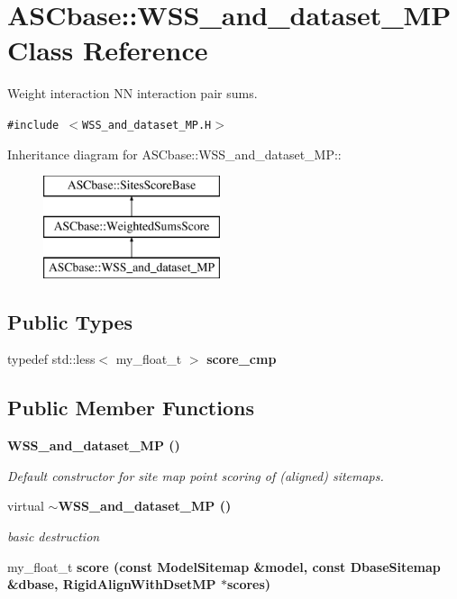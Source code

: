 \section{ASCbase::WSS\_\-and\_\-dataset\_\-MP Class Reference}
\label{classASCbase_1_1WSS__and__dataset__MP}
Weight interaction NN interaction pair sums.  


{\tt \#include $<$WSS\_\-and\_\-dataset\_\-MP.H$>$}

Inheritance diagram for ASCbase::WSS\_\-and\_\-dataset\_\-MP::\begin{figure}[H]
\begin{center}
\leavevmode
\includegraphics[height=3cm]{classASCbase_1_1WSS__and__dataset__MP}
\end{center}
\end{figure}
\subsection*{Public Types}
\begin{CompactItemize}
\item 
typedef std::less$<$ my\_\-float\_\-t $>$ \textbf{score\_\-cmp}\label{classASCbase_1_1WSS__and__dataset__MP_f17104e906fa8b27692f8956cb88c5f6}

\end{CompactItemize}
\subsection*{Public Member Functions}
\begin{CompactItemize}
\item 
\bf{WSS\_\-and\_\-dataset\_\-MP} ()\label{classASCbase_1_1WSS__and__dataset__MP_9dcca2b8b93687cd031fae82a6327ffe}

\begin{CompactList}\small\item\em Default constructor for site map point scoring of (aligned) sitemaps. \item\end{CompactList}\item 
virtual \bf{$\sim$WSS\_\-and\_\-dataset\_\-MP} ()\label{classASCbase_1_1WSS__and__dataset__MP_51cabafd4f5038cb70d9fea0c5e97d49}

\begin{CompactList}\small\item\em basic destruction \item\end{CompactList}\item 
my\_\-float\_\-t \bf{score} (const \bf{Model\-Sitemap} \&model, const \bf{Dbase\-Sitemap} \&dbase, Rigid\-Align\-With\-Dset\-MP $\ast$scores)
\end{CompactItemize}


